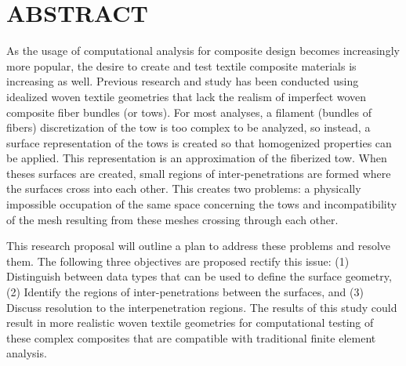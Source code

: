 %
%
%
%

\chapter*{ABSTRACT}

\pagestyle{plain} %
\setcounter{page}{2}

As the usage of computational analysis for composite design becomes increasingly more popular, the desire to create and test textile composite materials is increasing as well. Previous research and study has been conducted using idealized woven textile geometries that lack the realism of imperfect woven composite fiber bundles (or tows). For most analyses, a filament (bundles of fibers) discretization of the tow is too complex to be analyzed, so instead, a surface representation of the tows is created so that homogenized properties can be applied. This representation is an approximation of the fiberized tow. When theses surfaces are created, small regions of inter-penetrations are formed where the surfaces cross into each other. This creates two problems: a physically impossible occupation of the same space concerning the tows and incompatibility of the mesh resulting from these meshes crossing through each other.


This research proposal will outline a plan to address these problems and resolve them. The following three objectives are proposed rectify this issue: (1) Distinguish between data types that can be used to define the surface geometry, (2) Identify the regions of inter-penetrations between the surfaces, and (3) Discuss resolution to the interpenetration regions. The results of this study could result in more realistic woven textile geometries for computational testing of these complex composites that are compatible with traditional finite element analysis.


 

\pagebreak{}
